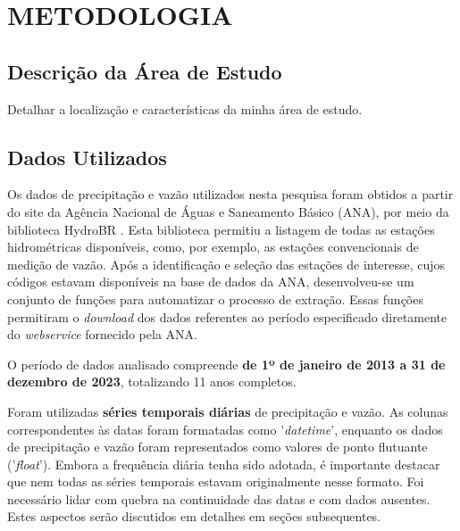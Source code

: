 \chapter{METODOLOGIA}
\section{Descrição da Área de Estudo}
Detalhar a localização e características da minha área de estudo.

\section{Dados Utilizados}

Os dados de precipitação e vazão utilizados nesta pesquisa foram obtidos a partir do site da Agência Nacional de Águas e Saneamento Básico (ANA), por meio da biblioteca HydroBR \cite{carvalho2020hydrobr}. Esta biblioteca permitiu a listagem de todas as estações hidrométricas disponíveis, como, por exemplo, as estações convencionais de medição de vazão. Após a identificação e seleção das estações de interesse, cujos códigos estavam disponíveis na base de dados da ANA, desenvolveu-se um conjunto de funções para automatizar o processo de extração. Essas funções permitiram o \textit{download} dos dados referentes ao período especificado diretamente do \textit{webservice} fornecido pela ANA.

O período de dados analisado compreende \textbf{de 1º de janeiro de 2013 a 31 de dezembro de 2023}, totalizando 11 anos completos.

Foram utilizadas \textbf{séries temporais diárias} de precipitação e vazão. As colunas correspondentes às datas foram formatadas como '\textit{datetime}', enquanto os dados de precipitação e vazão foram representados como valores de ponto flutuante ('\textit{float}'). Embora a frequência diária tenha sido adotada, é importante destacar que nem todas as séries temporais estavam originalmente nesse formato. Foi necessário lidar com quebra na continuidade das datas e com dados ausentes. Estes aspectos serão discutidos em detalhes em seções subsequentes.


